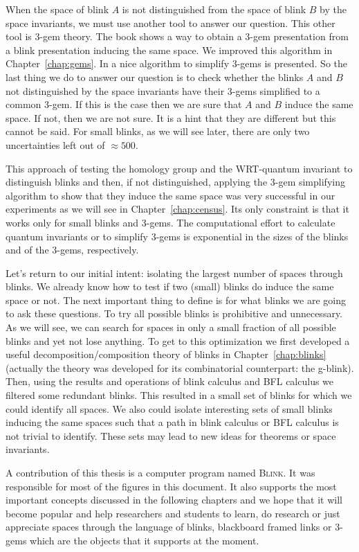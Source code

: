 When the space of blink $A$ is not distinguished from the space
of blink $B$ by the space invariants, we must use another tool to answer
our question. This other tool is 3-gem theory. The book
\cite{KauffmanAndLins1994} shows a way to obtain a 3-gem presentation
from a blink presentation inducing the same space. We improved this
algorithm in Chapter~\ref{chap:gems}. In \cite{Lins1995}
a nice algorithm to simplify 3-gems is presented. So the last thing
we do to answer our question is to check whether the
blinks $A$ and $B$ not distinguished by the space invariants have
their 3-gems simplified to a common 3-gem. If this is the case then
we are sure that $A$ and $B$ induce the same space. If not, then we
are not sure. It is a hint that they are different but this cannot
be said. For small blinks, as we will see later, there are only two
uncertainties left out of $\approx 500$.

This approach of testing the homology group and the WRT-quantum invariant
to distinguish blinks and then, if not distinguished,
applying the 3-gem simplifying algorithm to show that they induce
the same space was very successful in our experiments as we will
see in Chapter~\ref{chap:census}. Its only constraint is that
it works only for small blinks and 3-gems. The computational
effort to calculate quantum invariants or to simplify 3-gems is exponential
in the sizes of the blinks and of the 3-gems, respectively.

Let's return to our initial intent: isolating the largest number of
spaces through blinks. We already know how to test if two (small)
blinks do induce the same space or not. The next important thing
to define is for what blinks we are going to ask these questions.
To try all possible blinks is prohibitive and unnecessary. As we
will see, we can search for spaces in only a small fraction of all possible
blinks and yet not lose anything. To get to this optimization
we first developed a useful decomposition/composition theory
of blinks in Chapter~\ref{chap:blinks} (actually the theory was developed
for its combinatorial counterpart: the g-blink). Then, using the
results and operations of blink calculus and BFL calculus we filtered
some redundant blinks. This resulted in a small set of blinks for which we
could identify all spaces. We also could isolate interesting sets
of small blinks inducing the same spaces such that a path in blink
calculus or BFL calculus is not trivial to identify. These sets may
lead to new ideas for theorems or space invariants.

A contribution of this thesis is a computer program named \textsc{Blink}.
It was responsible for most of the figures in this document. It also
supports the most important concepts discussed in the following
chapters and we hope that it will become popular and help researchers and
students to learn, do research or just appreciate spaces through
the language of blinks, blackboard framed links or 3-gems which are
the objects that it supports at the moment.


